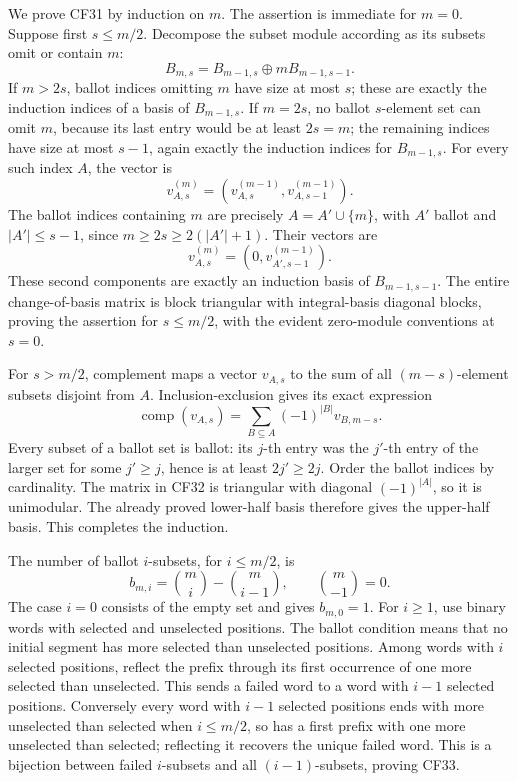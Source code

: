We prove CF31 by induction on \(m\). The assertion is immediate for \(m=0\). Suppose first \(s\leq m/2\). Decompose the subset module according as its subsets omit or contain \(m\):
\[
 B_{m,s}=B_{m-1,s}\oplus mB_{m-1,s-1}.
\]
If \(m>2s\), ballot indices omitting \(m\) have size at most \(s\); these are exactly the induction indices of a basis of \(B_{m-1,s}\). If \(m=2s\), no ballot \(s\)-element set can omit \(m\), because its last entry would be at least \(2s=m\); the remaining indices have size at most \(s-1\), again exactly the induction indices for \(B_{m-1,s}\). For every such index \(A\), the vector is
\[
 v_{A,s}^{(m)}=(v_{A,s}^{(m-1)},v_{A,s-1}^{(m-1)}).
\]
The ballot indices containing \(m\) are precisely \(A=A'\cup\{m\}\), with \(A'\) ballot and \(|A'|\leq s-1\), since \(m\geq2s\geq2(|A'|+1)\). Their vectors are
\[
 v_{A,s}^{(m)}=(0,v_{A',s-1}^{(m-1)}).
\]
These second components are exactly an induction basis of \(B_{m-1,s-1}\). The entire change-of-basis matrix is block triangular with integral-basis diagonal blocks, proving the assertion for \(s\leq m/2\), with the evident zero-module conventions at \(s=0\).

For \(s>m/2\), complement maps a vector \(v_{A,s}\) to the sum of all \((m-s)\)-element subsets disjoint from \(A\). Inclusion-exclusion gives its exact expression
\[
 \operatorname{comp}(v_{A,s})
 =\sum_{B\subseteq A}(-1)^{|B|}v_{B,m-s}.
 \tag{CF32}
\]
Every subset of a ballot set is ballot: its \(j\)-th entry was the \(j'\)-th entry of the larger set for some \(j'\geq j\), hence is at least \(2j'\geq2j\). Order the ballot indices by cardinality. The matrix in CF32 is triangular with diagonal \((-1)^{|A|}\), so it is unimodular. The already proved lower-half basis therefore gives the upper-half basis. This completes the induction.

The number of ballot \(i\)-subsets, for \(i\leq m/2\), is
\[
 b_{m,i}=\binom mi-\binom m{i-1},\qquad\binom m{-1}=0.
 \tag{CF33}
\]
The case \(i=0\) consists of the empty set and gives \(b_{m,0}=1\). For \(i\geq1\), use binary words with selected and unselected positions. The ballot condition means that no initial segment has more selected than unselected positions. Among words with \(i\) selected positions, reflect the prefix through its first occurrence of one more selected than unselected. This sends a failed word to a word with \(i-1\) selected positions. Conversely every word with \(i-1\) selected positions ends with more unselected than selected when \(i\leq m/2\), so has a first prefix with one more unselected than selected; reflecting it recovers the unique failed word. This is a bijection between failed \(i\)-subsets and all \((i-1)\)-subsets, proving CF33.

